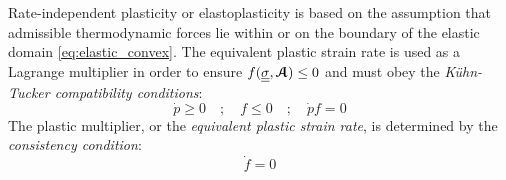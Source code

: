 \begin{example}[Elastoplasticity]
  Rate-independent plasticity or elastoplasticity is based on the assumption that admissible thermodynamic forces lie within or on the boundary of the elastic domain \eqref{eq:elastic_convex}. The equivalent plastic strain rate is used as a Lagrange multiplier in order to ensure $f({\underline{\underline{\sigma}}},{\boldsymbol{\mathcal{A}}})\leq 0$ and must obey the \textit{K{\"u}hn-Tucker compatibility conditions}:
\begin{equation}
  \label{eq:Kuhn_Tucker}
  \dot{p} \geq 0 \quad ; \quad f \leq 0 \quad ; \quad \dot{p}f =0 
\end{equation}
The plastic multiplier, or the \textit{equivalent plastic strain rate}, is determined by the \textit{consistency condition}:
\begin{equation}
  \label{eq:consistency_condition}
  \dot{f}=0
\end{equation}


\end{example}
